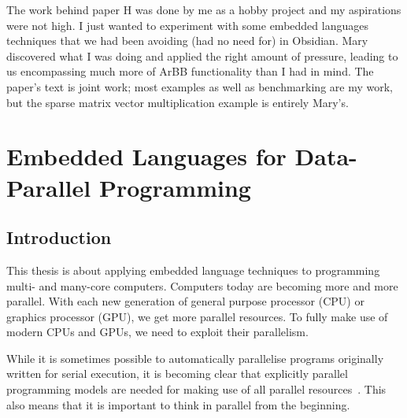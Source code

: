 \documentclass[a4paper]{book}
\newcommand{\thesistitle}{Embedded Languages for Data-Parallel Programming}
\begin{document}
The work behind paper H was done by me as a hobby project and my aspirations were not 
high. I just wanted to experiment with some embedded languages techniques that we had 
been avoiding (had no need for) in Obsidian. Mary discovered what I was doing and applied 
the right amount of pressure, leading to us encompassing much more of ArBB functionality than 
I had in mind. The paper's text is joint work; most examples as well as benchmarking are my work,
but the sparse matrix vector multiplication example is entirely Mary's. 



\tableofcontents


\cleardoublepage
\clearpage

\pagestyle{fancy}
\fancyfoot{}
\fancyhead[LO]{}
\fancyhead[RO]{\leftmark}
\renewcommand{\headrulewidth}{0.0pt}
\fancyhead[LE,RO]{\thepage}

%
%
\chapter{\thesistitle}

\section{Introduction} 

This thesis is about applying embedded language techniques to programming 
multi- and many-core computers. Computers today are becoming more and more  
parallel. With each new generation of 
general purpose processor (CPU) or graphics processor (GPU), we get more 
parallel resources. To fully make use of modern CPUs and GPUs, we need to
exploit their parallelism. 

While it is sometimes possible to automatically parallelise programs originally 
written for serial execution, it is becoming clear that explicitly parallel 
programming models are needed for making use of all parallel resources~\cite{STRUCTURED}. 
This also means that it is important to think in parallel from the beginning. 
\end{document}
